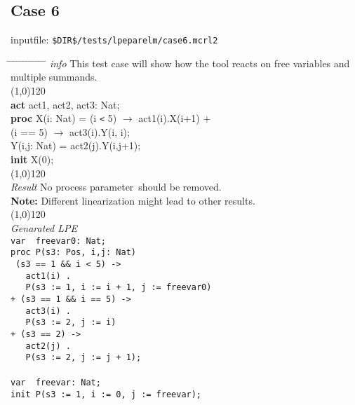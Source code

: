 \documentclass[a4paper,10pt]{article}
\theoremstyle{plain}
\theoremstyle{definition}
\newcommand{\ti}{\textit}
\newcommand{\tb}{\textbf}
\newcommand{\pp}{process parameter}
\newcommand{\tabw}{\hspace*{15.mm} \= \hspace*{20.mm} \= \hspace*{5.mm} \= \hspace*{5.mm} \= \hspace*{5.mm} \= \hspace*{5.mm}  \= \hspace*{5.mm}  \= \hspace*{5.mm}  \= \hspace*{5.mm} \= \hspace*{5.mm} \= \hspace*{5.mm}  \= \hspace*{5.mm}  \= \hspace*{5.mm}\kill}
\begin{document}
\subsection*{Case 6}
inputfile: \verb"$DIR$/tests/lpeparelm/case6.mcrl2"
\begin{tabbing}
\tabw
\ti{info} \> This test case will show how the tool reacts on free variables and multiple summands.\\
\line(1,0){120}\\
\tb{act} \> act1, act2, act3: Nat; \\
\tb{proc} \> X(i: Nat) \>  = \> (i \verb"<" 5) $\rightarrow$ act1(i).X(i+1) + \\
\> \> \>     (i == 5) $\rightarrow$ act3(i).Y(i, i); \\
\>     Y(i,j: Nat) \> = \> act2(j).Y(i,j+1); \\
\tb{init} X(0); \\
\line(1,0){120}\\
\ti{Result} \> No \pp\ should be removed.\\ 
\> \textbf{Note:} Different linearization might lead to other results.\\
\line(1,0){120}\\
\ti{Genarated LPE} \\
\>  \verb"var  freevar0: Nat;"\\
\>  \verb"proc P(s3: Pos, i,j: Nat)"\\
\>  \verb" (s3 == 1 && i < 5) ->"\\
\>  \verb"   act1(i) ."\\
\>  \verb"   P(s3 := 1, i := i + 1, j := freevar0)"\\
\>  \verb"+ (s3 == 1 && i == 5) ->"\\
\>  \verb"   act3(i) ."\\
\>  \verb"   P(s3 := 2, j := i)"\\
\>  \verb"+ (s3 == 2) ->"\\
\>  \verb"   act2(j) ."\\
\>  \verb"   P(s3 := 2, j := j + 1);"\\
\\
\>  \verb"var  freevar: Nat;"\\
\>  \verb"init P(s3 := 1, i := 0, j := freevar);"\\
\end{tabbing}
\end{document}
